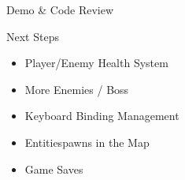 \documentclass[11pt,t,usepdftitle=false,aspectratio=169]{beamer}
\begin{document}
\begin{frame}[plain,c]
	\begin{center}
		\Huge{Demo \& Code Review}
	\end{center}
\end{frame}

\begin{frame}{Next Steps}
	\vspace{1em}
	\begin{itemize}
		\item Player/Enemy Health System
		\item More Enemies / Boss
		\item Keyboard Binding Management
		\item Entitiespawns in the Map
		\item Game Saves
	\end{itemize}
\end{frame}
\end{document}
